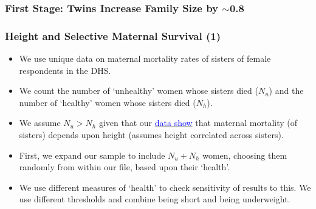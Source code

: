 \documentclass[10pt,letterpaper,subeqn]{beamer}
\begin{document}
\begin{frame}[label=Fstage2]
\frametitle{First Stage: Twins Increase Family Size by $\sim$0.8}

\hyperlink{IV}{}
\end{frame}

\begin{frame}[label=sumStatsN]

\hyperlink{sumStats}{}
\end{frame}


 \begin{frame}[label=Spain1]

\hyperlink{c}{}
\end{frame}

 \begin{frame}[label=Brazil]

\hyperlink{c}{}
\end{frame}

\begin{frame}[label=UK]
 
\hyperlink{c}{}
\end{frame}

\begin{frame}[label=Spain3]

\hyperlink{mechan}{}
\end{frame}

\begin{frame}[label=USA3]

\end{frame}

\begin{frame}

\end{frame}

\begin{frame}

\hyperlink{mechan}{}
\end{frame}


\begin{frame}[label=MMRselec]
\frametitle{Height and Selective Maternal Survival (1)} 
\begin{itemize}
\item We use unique data on maternal mortality rates of sisters of female respondents in the DHS.
\item We count the number of `unhealthy' women whose sisters died ($N_u$) and the number of `healthy' women whose sisters died ($N_h$).
\item We assume $N_u > N_h$ given that our \hyperlink{MMRcuts}{\textcolor{blue}{data show}} that maternal mortality (of sisters) depends upon height (assumes height correlated across sisters).
\item First, we expand our sample to include $N_u + N_h$ women, choosing them randomly from within our file, based upon their `health'.
\item We use different measures of `health' to check sensitivity of results to this. We use different thresholds and combine being short and being underweight.
\end{itemize}
\end{frame}
\end{document}
